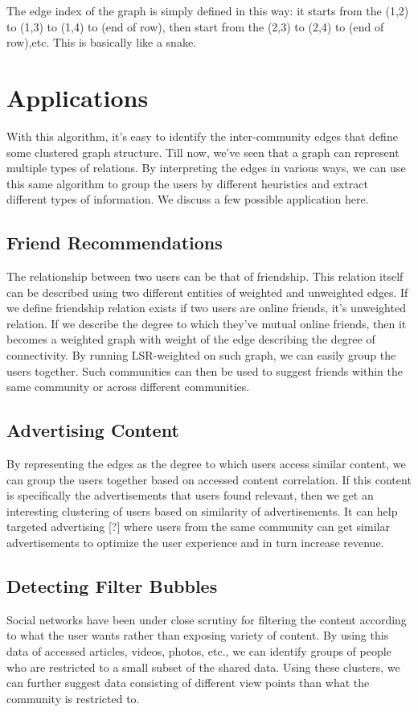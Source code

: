 \documentclass{article}
\begin{document}
The edge index of the graph is simply defined in this way: it starts from the
(1,2) to (1,3) to (1,4) to (end of row), then start from the (2,3) to (2,4) to (end of row),etc. This is basically like a snake.








\section{Applications}
With this algorithm, it's easy to identify the inter-community edges that define some clustered graph structure. Till
now, we've seen that a graph can represent multiple types of relations. By interpreting the edges in various ways, we
can use this same algorithm to group the users by different heuristics and extract different types of information. We
discuss a few possible application here.
\subsection{Friend Recommendations}
The relationship between two users can be that of friendship. This relation itself can be described using two different
entities of weighted and unweighted edges. If we define friendship relation exists if two users are online friends, it's
unweighted relation. If we describe the degree to which they've mutual online friends, then it becomes a weighted graph
with weight of the edge describing the degree of connectivity. By running LSR-weighted on such graph, we can easily
group the users together. Such communities can then be used to suggest friends within the same community or across
different communities. 

\subsection{Advertising Content}
By representing the edges as the degree to which users access similar content, we can group the users together based on
accessed content correlation. If this content is specifically the advertisements that users found relevant, then we get
an interesting clustering of users based on similarity of advertisements. It can help targeted advertising [?] where
users from the same community can get similar advertisements to optimize the user experience and in turn increase
revenue.

\subsection{Detecting Filter Bubbles}
Social networks have been under close scrutiny for filtering the content according to what the user wants rather than
exposing variety of content. By using this data of accessed articles, videos, photos, etc., we can identify groups of
people who are restricted to a small subset of the shared data. Using these clusters, we can further suggest data
consisting of different view points than what the community is restricted to.
\end{document}
